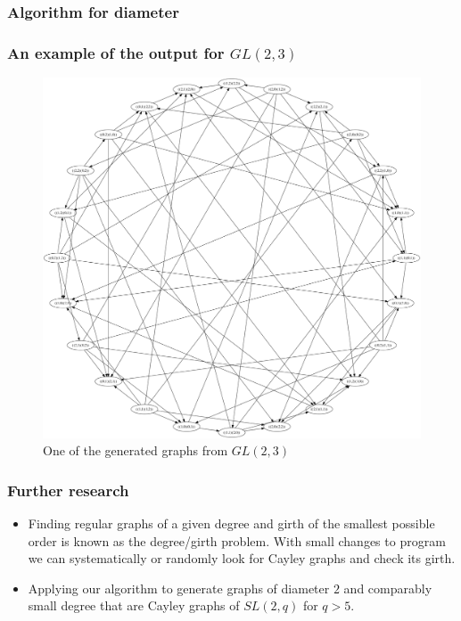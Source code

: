 \documentclass{beamer}
\begin{document}
\begin{frame}
	\frametitle{Algorithm for diameter}
	
\end{frame}
\begin{frame}
	\frametitle{An example of the output for $GL(2,3)$}
	\begin{figure}[!ht]
 		\centering
 		\includegraphics[scale=0.12]{example.png}
		\caption{One of the generated graphs from $GL(2,3)$ }
	\end{figure}
\end{frame}
\begin{frame}
	\frametitle{Further research}
	\begin{itemize}
		\item Finding regular graphs of a given degree and girth of the smallest possible order is known as the degree/girth problem. With small changes to program we can systematically or randomly look for Cayley graphs and check its girth.
		\item Applying our algorithm to generate graphs of diameter $2$ and comparably small degree that are Cayley graphs of $SL(2,q)$ for $q>5$.
	\end{itemize}
\end{frame}
\end{document}
